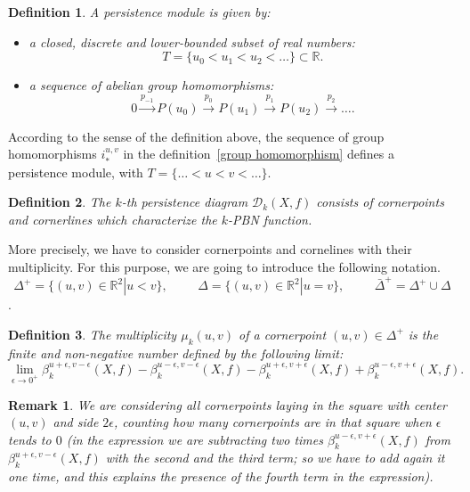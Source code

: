 \documentclass[english, LaM, oneside, noexaminfo]{sapthesis}
\newtheorem{oss}{\bf Remark}[section]
\newtheorem{defin}{\bf Definition}[section]
\begin{document}
\begin{defin} A \textit{persistence module} is given by:
\begin{itemize}
    \item a closed, discrete and lower-bounded subset of real numbers:
$$ T = \{u_0 < u_1 < u_2 <\dots\} \subset \mathbb{R}.$$
    \item a sequence of abelian group homomorphisms: $$0\xrightarrow{p_{-1}} P(u_0) \xrightarrow{p_0} P(u_1) \xrightarrow{p_1} P(u_2) \xrightarrow{p_2}\dots.$$
\end{itemize}
\end{defin}

\noindent According to the sense of the definition above, the sequence of group homomorphisms $i_*^{u,v}$ in the definition~\ref{group homomorphism} defines a persistence module, with $T = \{\dots < u < v <\dots\}.$

\begin{defin} The \textit{$k$-th persistence diagram} $\mathcal{D}_k(X,f)$ consists of cornerpoints and cornerlines which characterize the $k$-PBN function.\end{defin}

More precisely, we have to consider cornerpoints and cornelines with their multiplicity. For this purpose, we are going to introduce the following notation.
$$\Delta^{+} =\{(u,v) \in \mathbb{R}^2 | u < v\}, \hspace{1cm} \Delta=\{(u,v) \in \mathbb{R}^2 | u = v\}, \hspace{1cm} \bar{\Delta}^{+}=\Delta^{+}  \cup \Delta $$.

\begin{defin} The \textit{multiplicity} $\mu_{k}(u,v)$ of a cornerpoint $(u,v) \in \Delta^{+}$ is the finite and non-negative number defined by the following limit:
$$ \lim_{\epsilon \to 0^{+}} {\beta_{k}^{u+\epsilon,v-\epsilon}(X,f) - \beta_{k}^{u-\epsilon,v-\epsilon}(X,f) - \beta_{k}^{u+\epsilon,v+\epsilon}(X,f) + \beta_{k}^{u-\epsilon,v+\epsilon}(X,f) }. $$   \end{defin}

\begin{oss} We are considering all cornerpoints laying in the square with center $(u,v)$ and side $2\epsilon$, counting how many cornerpoints are in that square when $\epsilon$ tends to $0$ (in the expression we are subtracting two times $\beta_{k}^{u-\epsilon,v+\epsilon}(X,f)$ from $\beta_{k}^{u+\epsilon,v-\epsilon}(X,f)$ with the second and the third term; so we have to add again it one time, and this explains the presence of the fourth term in the expression). \end{oss}
\end{document}
